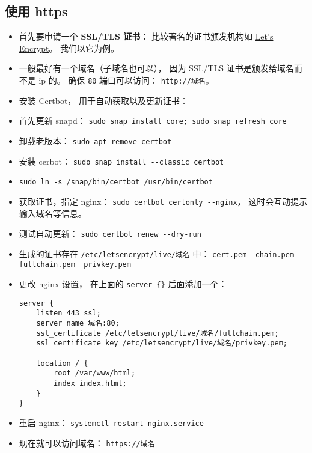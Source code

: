 \subsection{使用 https}
\begin{itemize}
\item 首先要申请一个 \textbf{SSL/TLS 证书}： 比较著名的证书颁发机构如 \href{https://letsencrypt.org/}{Let's Encrypt}。 我们以它为例。
\item 一般最好有一个域名（子域名也可以）， 因为 SSL/TLS 证书是颁发给域名而不是 ip 的。 确保 \verb|80| 端口可以访问： \verb|http://域名|。
\item 安装 \href{https://certbot.eff.org/instructions?ws=nginx&os=ubuntufocal}{Certbot}， 用于自动获取以及更新证书：
\item 首先更新 snapd： \verb|sudo snap install core; sudo snap refresh core|
\item 卸载老版本： \verb|sudo apt remove certbot|
\item 安装 cerbot： \verb|sudo snap install --classic certbot|
\item \verb|sudo ln -s /snap/bin/certbot /usr/bin/certbot|
\item 获取证书，指定 nginx： \verb|sudo certbot certonly --nginx|， 这时会互动提示输入域名等信息。
\item 测试自动更新： \verb|sudo certbot renew --dry-run|
\item 生成的证书存在 \verb|/etc/letsencrypt/live/域名| 中： \verb|cert.pem  chain.pem  fullchain.pem  privkey.pem|
\item 更改 nginx 设置， 在上面的 \verb|server {}| 后面添加一个：
\begin{lstlisting}[language=none]
server {
    listen 443 ssl;
    server_name 域名:80;
    ssl_certificate /etc/letsencrypt/live/域名/fullchain.pem;
    ssl_certificate_key /etc/letsencrypt/live/域名/privkey.pem;

    location / {
        root /var/www/html;
        index index.html;
    }
}
\end{lstlisting}
\item 重启 nginx： \verb|systemctl restart nginx.service|
\item 现在就可以访问域名： \verb|https://域名|
\end{itemize}
